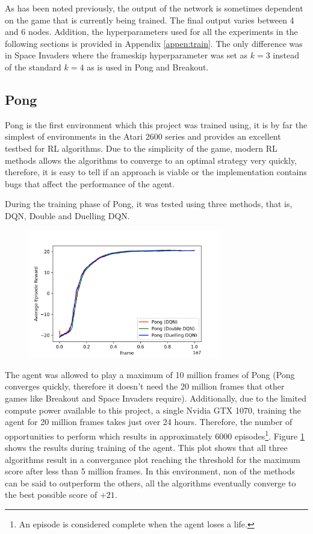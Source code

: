As has been noted previously, the output of the network is sometimes dependent on the game that is currently being trained. The final output varies between 4 and 6 nodes. Addition, the hyperparameters used for all the experiments in the following sections is provided in Appendix \ref{appen:train}. The only difference was in Space Invaders where the frameskip hyperparameter was set as $k = 3$ instead of the standard $k = 4$ as is used in Pong and Breakout.

\subsection{Pong}
Pong is the first environment which this project was trained using, it is by far the simplest of environments in the Atari 2600 series and provides an excellent testbed for RL algorithms. Due to the simplicity of the game, modern RL methods allows the algorithms to converge to an optimal strategy very quickly, therefore, it is easy to tell if an approach is viable or the implementation contains bugs that affect the performance of the agent.

During the training phase of Pong, it was tested using three methods, that is, DQN, Double and Duelling DQN.

\begin{figure}[htbp]
  \centering
  \includegraphics[width=0.75\textwidth]{chapters/chapter5/images/pong_plot.jpg}
  \caption[Pong Training results]{
    \label{fig:pong-train-results}
  }
\end{figure}

The agent was allowed to play a maximum of 10 million frames of Pong (Pong converges quickly, therefore it doesn't need the 20 million frames that other games like Breakout and Space Invaders require). Additionally, due to the limited compute power available to this project, a single Nvidia GTX 1070, training the agent for 20 million frames takes just over 24 hours. Therefore, the number of opportunities to perform  which results in approximately 6000 episodes\footnote{An episode is considered complete when the agent loses a life.}. Figure \ref{fig:pong-train-results} shows the results during training of the agent. This plot shows that all three algorithms result in a convergance plot reaching the threshold for the maximum score after less than 5 million frames. In this environment, non of the methods can be said to outperform the others, all the algorithms eventually converge to the best possible score of $+21$.

